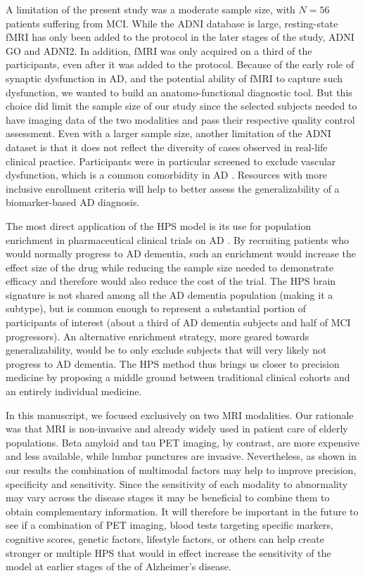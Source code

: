 \documentclass[authoryear]{elsarticle}
\begin{document}
A limitation of the present study was a moderate sample size, with $N=56$ patients suffering from MCI. While the ADNI database is large, resting-state fMRI has only been added to the protocol in the later stages of the study, ADNI GO and ADNI2. In addition, fMRI was only acquired on a third of the participants, even after it was added to the protocol. Because of the early role of synaptic dysfunction in AD, and the potential ability of fMRI to capture such dysfunction, we wanted to build an anatomo-functional diagnostic tool. But this choice did limit the sample size of our study since the selected subjects needed to have imaging data of the two modalities and pass their respective quality control assessment. Even with a larger sample size, another limitation of the ADNI dataset is that it does not reflect the diversity of cases observed in real-life clinical practice. Participants were in particular screened to exclude vascular dysfunction, which is a common comorbidity in AD \citep{Gorelick2011}. Resources with more inclusive enrollment criteria will help to better assess the generalizability of a biomarker-based AD diagnosis. 

The most direct application of the HPS model is its use for population enrichment in pharmaceutical clinical trials on AD \citep{Woo2017,Mathotaarachchi2017}. By recruiting patients who would normally progress to AD dementia, such an enrichment would increase the effect size of the drug while reducing the sample size needed to demonstrate efficacy and therefore would also reduce the cost of the trial. The HPS brain signature is not shared among all the AD dementia population (making it a subtype), but is common enough to represent a substantial portion of participants of interest (about a third of AD dementia subjects and half of MCI progressors). An alternative enrichment strategy, more geared towards generalizability, would be to only exclude subjects that will very likely not progress to AD dementia. The HPS method thus brings us closer to precision medicine by proposing a middle ground between traditional clinical cohorts and an entirely individual medicine.

In this manuscript, we focused exclusively on two MRI modalities. Our rationale was that MRI is non-invasive and already widely used in patient care of elderly populations. Beta amyloid and tau PET imaging, by contrast, are more expensive and less available, while lumbar punctures are invasive. Nevertheless, as shown in our results the combination of multimodal factors may help to improve precision, specificity and sensitivity. Since the sensitivity of each modality to abnormality may vary across the disease stages it may be beneficial to combine them to obtain complementary information. It will therefore be important in the future to see if a combination of PET imaging, blood tests targeting specific markers, cognitive scores, genetic factors, lifestyle factors, or others can help create stronger or multiple HPS that would in effect increase the sensitivity of the model at earlier stages of the of Alzheimer's disease.
\end{document}
